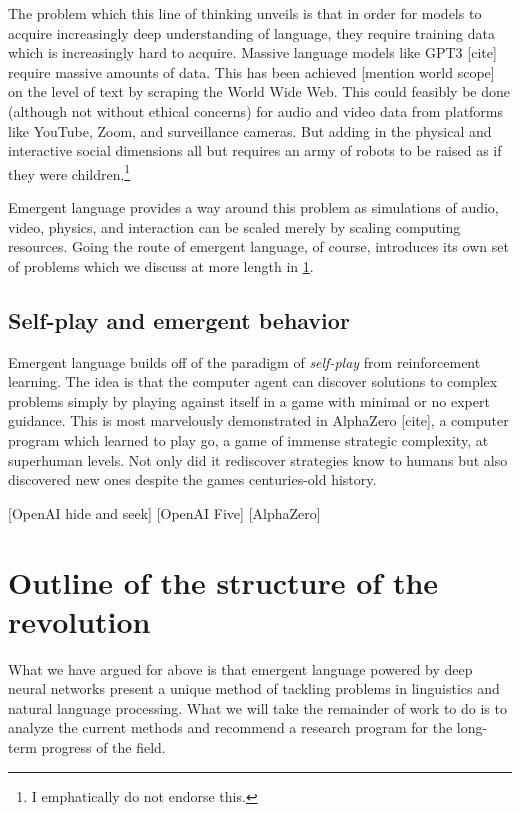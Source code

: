 \documentclass[letterpaper]{report}
\newcommand\cmg[1]{{\color{gray}[#1]}}
\begin{document}
The problem which this line of thinking unveils is that in order for models to acquire increasingly deep understanding of language, they require training data which is increasingly hard to acquire.
Massive language models like GPT3 \cmg{cite} require massive amounts of data.
This has been achieved \cmg{mention world scope} on the level of text by scraping the World Wide Web.
This could feasibly be done (although not without ethical concerns) for audio and video data from platforms like YouTube, Zoom, and surveillance cameras.
But adding in the physical and interactive social dimensions all but requires an army of robots to be raised as if they were children.\footnote{I emphatically do not endorse this.}

Emergent language provides a way around this problem as simulations of audio, video, physics, and interaction can be scaled merely by scaling computing resources.
Going the route of emergent language, of course, introduces its own set of problems which we discuss at more length in \cref{sec:prereqs}.


\subsection{Self-play and emergent behavior}
Emergent language builds off of the paradigm of \emph{self-play} from reinforcement learning.
The idea is that the computer agent can discover solutions to complex problems simply by playing against itself in a game with minimal or no expert guidance.
This is most marvelously demonstrated in AlphaZero \cmg{cite}, a computer program which learned to play go, a game of immense strategic complexity, at superhuman levels.
Not only did it rediscover strategies know to humans but also discovered new ones despite the games centuries-old history.

\cmg{OpenAI hide and seek}
\cmg{OpenAI Five}
\cmg{AlphaZero}

\section{Outline of the structure of the revolution}\label{sec:prereqs}
What we have argued for above is that emergent language powered by deep neural networks present a unique method of tackling problems in linguistics and natural language processing.
What we will take the remainder of work to do is to
    analyze the current methods
    and recommend a research program for the long-term progress of the field.
\end{document}

